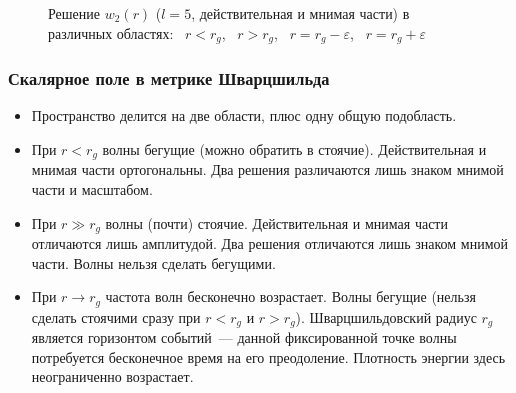 \documentclass[compress, 9pt]{beamer}
\begin{document}
    \begin{frame}
        \begin{figure}[h]
            \centering
            \hspace{8pt}%
            \hspace{8pt}%
            \hspace{8pt}%
            \hspace{8pt}%
            \caption[]{Решение $w_2(r)$ ($l = 5$, действительная и мнимая части) в различных областях:
                ~$r<r_g$,
                ~$r > r_g$,
                ~$r = r_g - \varepsilon$,
                ~$r = r_g + \varepsilon$}%
            \label{fig:scal-rg2}%
        \end{figure}

    \end{frame}

    \begin{frame}\frametitle{Скалярное поле в метрике Шварцшильда}

        \begin{itemize}\justifying
            \item Пространство делится на две области, плюс одну общую подобласть.
            \item При $r < r_g$ волны бегущие (можно обратить в стоячие). Действительная и мнимая части ортогональны. Два решения различаются лишь знаком мнимой части и масштабом.
            \item При $r \gg r_g$ волны (почти) стоячие. Действительная и мнимая части отличаются лишь амплитудой. Два решения отличаются лишь знаком мнимой части. Волны нельзя сделать бегущими.
            \item При $r \to r_g$ частота волн бесконечно возрастает. Волны бегущие (нельзя сделать стоячими сразу при $r < r_g$ и $r > r_g$). Шварцшильдовский радиус $r_g$ является горизонтом событий~--- данной фиксированной точке волны потребуется бесконечное время на его преодоление. Плотность энергии здесь неограниченно возрастает.
        \end{itemize}

    \end{frame}
\end{document}
